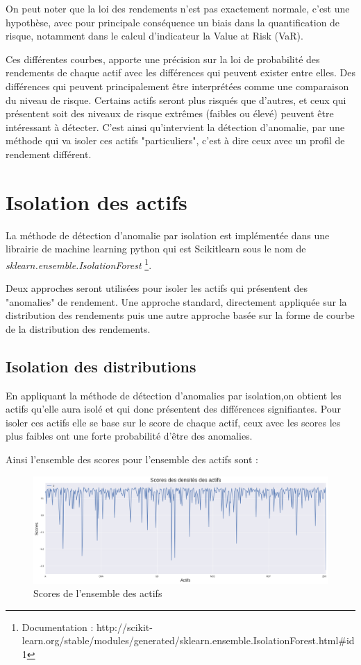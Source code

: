 On peut noter que la loi des rendements n'est pas exactement normale, c'est une hypothèse, avec pour principale conséquence un biais dans la quantification de risque, notamment dans le calcul d'indicateur la Value at Risk (VaR).

Ces différentes courbes, apporte une précision sur la loi de probabilité des rendements de chaque actif avec les différences qui peuvent exister entre elles. Des différences qui peuvent principalement être interprétées comme une comparaison du niveau de risque. Certains actifs seront plus risqués que d'autres, et ceux qui présentent soit des niveaux de risque extrêmes (faibles ou élevé) peuvent être intéressant à détecter. C'est ainsi qu'intervient la détection d'anomalie, par une méthode qui va isoler ces actifs "particuliers", c'est à dire ceux avec un profil de rendement différent.

\section{Isolation des actifs}

La méthode de détection d'anomalie par isolation est implémentée  dans une librairie de machine learning python qui est Scikitlearn sous le nom de \emph{sklearn.ensemble.IsolationForest} \footnote{Documentation : http://scikit-learn.org/stable/modules/generated/sklearn.ensemble.IsolationForest.html\#id1}. 

Deux approches seront utilisées pour isoler les actifs qui présentent des "anomalies" de rendement. Une approche standard, directement appliquée sur la distribution des rendements puis une autre approche basée sur la forme de courbe de la distribution des rendements.

\subsection{Isolation des distributions}

En appliquant la méthode de détection d'anomalies par isolation,on obtient les actifs qu'elle aura isolé et qui donc présentent des différences signifiantes. Pour isoler ces actifs elle se base sur le score de chaque actif, ceux avec les scores les plus faibles ont une forte probabilité d'être des anomalies.

Ainsi l'ensemble des scores pour l'ensemble des actifs sont : 


\begin{figure}[H]
\centering
\caption{Scores de l'ensemble des actifs}
   \includegraphics[scale=0.35]{img/scores_densite_all.png}
\end{figure}

